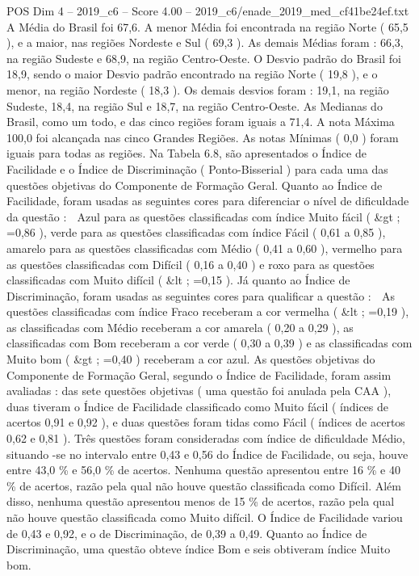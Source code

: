 \begin{textsample}{POS Dim 4 – 2019\_c6 – Score 4.00 – 2019\_c6/enade\_2019\_med\_cf41be24ef.txt}
A Média do Brasil foi 67,6.
A menor Média foi encontrada na região Norte ( 65,5 ), e a maior, nas regiões Nordeste e Sul ( 69,3 ).
As demais Médias foram : 66,3, na região Sudeste e 68,9, na região Centro-Oeste.
O Desvio padrão do Brasil foi 18,9, sendo o maior Desvio padrão encontrado na região Norte ( 19,8 ), e o menor, na região Nordeste ( 18,3 ).
Os demais desvios foram : 19,1, na região Sudeste, 18,4, na região Sul e 18,7, na região Centro-Oeste.
As Medianas do Brasil, como um todo, e das cinco regiões foram iguais a 71,4.
A nota Máxima 100,0 foi alcançada nas cinco Grandes Regiões.
As notas Mínimas ( 0,0 ) foram iguais para todas as regiões.
Na Tabela 6.8, são apresentados o Índice de Facilidade e o Índice de Discriminação ( Ponto-Bisserial ) para cada uma das questões objetivas do Componente de Formação Geral.
Quanto ao Índice de Facilidade, foram usadas as seguintes cores para diferenciar o nível de dificuldade da questão :  Azul para as questões classificadas com índice Muito fácil ( \&gt ; =0,86 ), verde para as questões classificadas com índice Fácil ( 0,61 a 0,85 ), amarelo para as questões classificadas com Médio ( 0,41 a 0,60 ), vermelho para as questões classificadas com Difícil ( 0,16 a 0,40 ) e roxo para as questões classificadas com Muito difícil ( \&lt ; =0,15 ).
Já quanto ao Índice de Discriminação, foram usadas as seguintes cores para qualificar a questão :  As questões classificadas com índice Fraco receberam a cor vermelha ( \&lt ; =0,19 ), as classificadas com Médio receberam a cor amarela ( 0,20 a 0,29 ), as classificadas com Bom receberam a cor verde ( 0,30 a 0,39 ) e as classificadas com Muito bom ( \&gt ; =0,40 ) receberam a cor azul.
As questões objetivas do Componente de Formação Geral, segundo o Índice de Facilidade, foram assim avaliadas : das sete questões objetivas ( uma questão foi anulada pela CAA ), duas tiveram o Índice de Facilidade classificado como Muito fácil ( índices de acertos 0,91 e 0,92 ), e duas questões foram tidas como Fácil ( índices de acertos 0,62 e 0,81 ).
Três questões foram consideradas com índice de dificuldade Médio, situando -se no intervalo entre 0,43 e 0,56 do Índice de Facilidade, ou seja, houve entre 43,0 \% e 56,0 \% de acertos.
Nenhuma questão apresentou entre 16 \% e 40 \% de acertos, razão pela qual não houve questão classificada como Difícil.
Além disso, nenhuma questão apresentou menos de 15 \% de acertos, razão pela qual não houve questão classificada como Muito difícil.
O Índice de Facilidade variou de 0,43 e 0,92, e o de Discriminação, de 0,39 a 0,49.
Quanto ao Índice de Discriminação, uma questão obteve índice Bom e seis obtiveram índice Muito bom.

\end{textsample}
